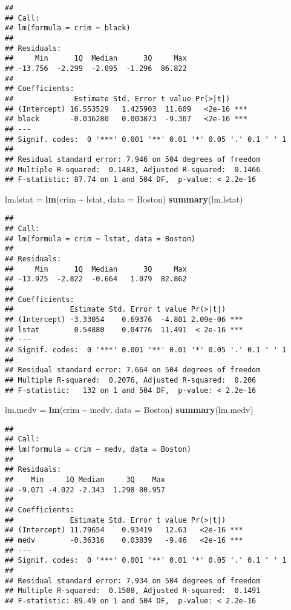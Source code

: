 \documentclass[
]{article}
\newenvironment{Shaded}{\begin{snugshade}}{\end{snugshade}}
\newcommand{\AttributeTok}[1]{\textcolor[rgb]{0.13,0.29,0.53}{#1}}
\newcommand{\FunctionTok}[1]{\textcolor[rgb]{0.13,0.29,0.53}{\textbf{#1}}}
\newcommand{\NormalTok}[1]{#1}
\newcommand{\OtherTok}[1]{\textcolor[rgb]{0.56,0.35,0.01}{#1}}
\newcommand{\SpecialCharTok}[1]{\textcolor[rgb]{0.81,0.36,0.00}{\textbf{#1}}}
\begin{document}
\begin{verbatim}
## 
## Call:
## lm(formula = crim ~ black)
## 
## Residuals:
##     Min      1Q  Median      3Q     Max 
## -13.756  -2.299  -2.095  -1.296  86.822 
## 
## Coefficients:
##              Estimate Std. Error t value Pr(>|t|)    
## (Intercept) 16.553529   1.425903  11.609   <2e-16 ***
## black       -0.036280   0.003873  -9.367   <2e-16 ***
## ---
## Signif. codes:  0 '***' 0.001 '**' 0.01 '*' 0.05 '.' 0.1 ' ' 1
## 
## Residual standard error: 7.946 on 504 degrees of freedom
## Multiple R-squared:  0.1483, Adjusted R-squared:  0.1466 
## F-statistic: 87.74 on 1 and 504 DF,  p-value: < 2.2e-16
\end{verbatim}

\begin{Shaded}
\begin{Highlighting}[]
\NormalTok{lm.lstat }\OtherTok{=} \FunctionTok{lm}\NormalTok{(crim }\SpecialCharTok{\textasciitilde{}}\NormalTok{ lstat, }\AttributeTok{data =}\NormalTok{ Boston)}
\FunctionTok{summary}\NormalTok{(lm.lstat)}
\end{Highlighting}
\end{Shaded}

\begin{verbatim}
## 
## Call:
## lm(formula = crim ~ lstat, data = Boston)
## 
## Residuals:
##     Min      1Q  Median      3Q     Max 
## -13.925  -2.822  -0.664   1.079  82.862 
## 
## Coefficients:
##             Estimate Std. Error t value Pr(>|t|)    
## (Intercept) -3.33054    0.69376  -4.801 2.09e-06 ***
## lstat        0.54880    0.04776  11.491  < 2e-16 ***
## ---
## Signif. codes:  0 '***' 0.001 '**' 0.01 '*' 0.05 '.' 0.1 ' ' 1
## 
## Residual standard error: 7.664 on 504 degrees of freedom
## Multiple R-squared:  0.2076, Adjusted R-squared:  0.206 
## F-statistic:   132 on 1 and 504 DF,  p-value: < 2.2e-16
\end{verbatim}

\begin{Shaded}
\begin{Highlighting}[]
\NormalTok{lm.medv }\OtherTok{=} \FunctionTok{lm}\NormalTok{(crim }\SpecialCharTok{\textasciitilde{}}\NormalTok{ medv, }\AttributeTok{data =}\NormalTok{ Boston)}
\FunctionTok{summary}\NormalTok{(lm.medv)}
\end{Highlighting}
\end{Shaded}

\begin{verbatim}
## 
## Call:
## lm(formula = crim ~ medv, data = Boston)
## 
## Residuals:
##    Min     1Q Median     3Q    Max 
## -9.071 -4.022 -2.343  1.298 80.957 
## 
## Coefficients:
##             Estimate Std. Error t value Pr(>|t|)    
## (Intercept) 11.79654    0.93419   12.63   <2e-16 ***
## medv        -0.36316    0.03839   -9.46   <2e-16 ***
## ---
## Signif. codes:  0 '***' 0.001 '**' 0.01 '*' 0.05 '.' 0.1 ' ' 1
## 
## Residual standard error: 7.934 on 504 degrees of freedom
## Multiple R-squared:  0.1508, Adjusted R-squared:  0.1491 
## F-statistic: 89.49 on 1 and 504 DF,  p-value: < 2.2e-16
\end{verbatim}
\end{document}
